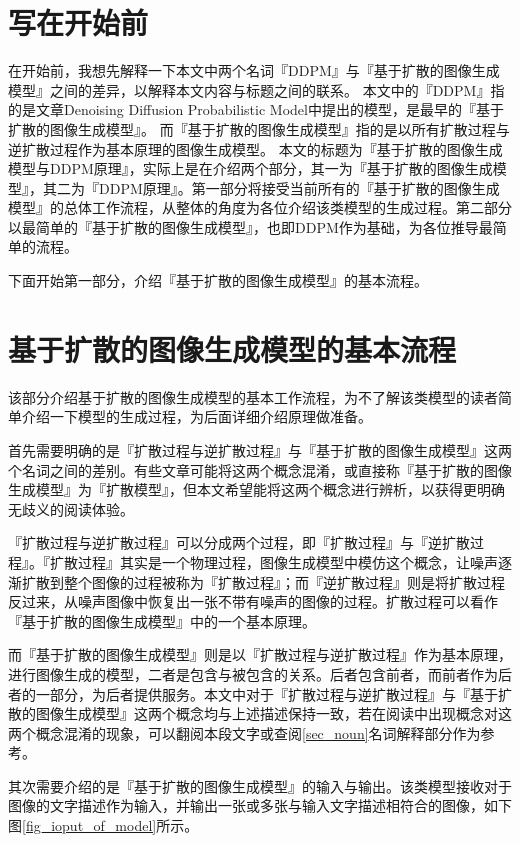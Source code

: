 \section{写在开始前}

在开始前，我想先解释一下本文中两个名词『DDPM』与『基于扩散的图像生成模型』之间的差异，以解释本文内容与标题之间的联系。
本文中的『DDPM』指的是文章Denoising Diffusion Probabilistic Model\cite{hoDenoisingDiffusionProbabilistic2020a}中提出的模型，是最早的『基于扩散的图像生成模型』。
而『基于扩散的图像生成模型』指的是以所有扩散过程与逆扩散过程作为基本原理的图像生成模型。
本文的标题为『基于扩散的图像生成模型与DDPM原理』，实际上是在介绍两个部分，其一为『基于扩散的图像生成模型』，其二为『DDPM原理』。第一部分将接受当前所有的『基于扩散的图像生成模型』的总体工作流程，从整体的角度为各位介绍该类模型的生成过程。第二部分以最简单的『基于扩散的图像生成模型』，也即DDPM作为基础，为各位推导最简单的流程。

下面开始第一部分，介绍『基于扩散的图像生成模型』的基本流程。

\section{基于扩散的图像生成模型的基本流程}

该部分介绍基于扩散的图像生成模型的基本工作流程，为不了解该类模型的读者简单介绍一下模型的生成过程，为后面详细介绍原理做准备。

首先需要明确的是『扩散过程与逆扩散过程』与『基于扩散的图像生成模型』这两个名词之间的差别。有些文章可能将这两个概念混淆，或直接称『基于扩散的图像生成模型』为『扩散模型』，但本文希望能将这两个概念进行辨析，以获得更明确无歧义的阅读体验。

『扩散过程与逆扩散过程』可以分成两个过程，即『扩散过程』与『逆扩散过程』。『扩散过程』其实是一个物理过程，图像生成模型中模仿这个概念，让噪声逐渐扩散到整个图像的过程被称为『扩散过程』；而『逆扩散过程』则是将扩散过程反过来，从噪声图像中恢复出一张不带有噪声的图像的过程。扩散过程可以看作『基于扩散的图像生成模型』中的一个基本原理。

而『基于扩散的图像生成模型』则是以『扩散过程与逆扩散过程』作为基本原理，进行图像生成的模型，二者是包含与被包含的关系。后者包含前者，而前者作为后者的一部分，为后者提供服务。本文中对于『扩散过程与逆扩散过程』与『基于扩散的图像生成模型』这两个概念均与上述描述保持一致，若在阅读中出现概念对这两个概念混淆的现象，可以翻阅本段文字或查阅\ref{sec_noun}名词解释部分作为参考。

其次需要介绍的是『基于扩散的图像生成模型』的输入与输出。该类模型接收对于图像的文字描述作为输入，并输出一张或多张与输入文字描述相符合的图像，如下图\ref{fig_ioput_of_model}所示。

